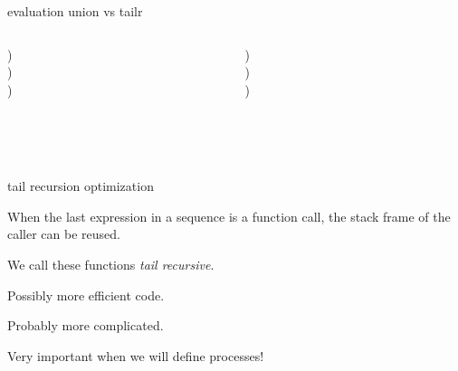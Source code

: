 \begin{frame}[fragile]{evaluation union vs tailr}

\begin{columns}
  \begin{column}{0.5\textwidth}
)\\
\pause\hspace{20pt}{\tt z = union([:b], [:c])})\\
\pause\hspace{40pt}{\tt z' = union([],[:c])})\\
\pause\hspace{60pt}{\tt [:c]}\\
\pause\hspace{40pt}{\tt [:b|z']}\\
\pause\hspace{20pt}{\tt [:a|z]}\\
\pause{\tt [:a,:b,:c]}
\end{column}
\begin{column}{0.5\textwidth}
)\\
\pause\hspace{20pt}{\tt tailr([:b], [:a, :c])})\\
\pause\hspace{40pt}{\tt tailr([],[:b,:a,:c])})\\
\pause\hspace{60pt}{\tt [:b,:a:,:c]}\\
\pause\hspace{40pt}{\tt [:b,:a:,:c]}\\
\pause\hspace{20pt}{\tt [:b,:a:,:c]}\\
\pause{\tt [:b,:a,:c]}
\end{column}
\end{columns}

\end{frame}


\begin{frame}{tail recursion optimization}

When the last expression in a sequence is a function call, the stack
frame of the caller can be reused.

\pause\vspace{20pt}We call these functions {\em tail recursive}.

\pause\vspace{20pt}Possibly more efficient code.

\pause\vspace{20pt}Probably more complicated.

\pause\vspace{20pt}Very important when we will define processes!

\end{frame}


